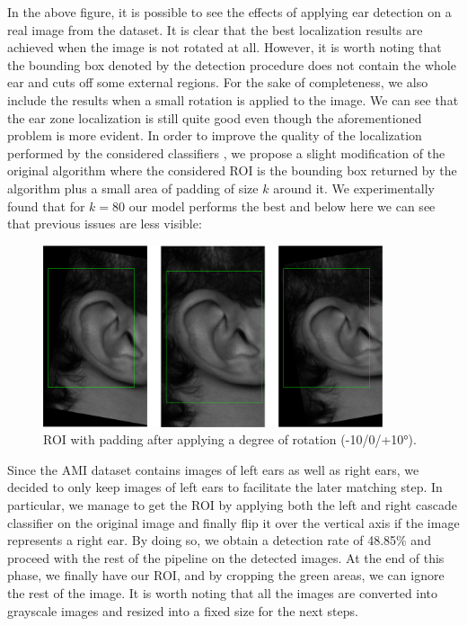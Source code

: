 \documentclass{article}
\begin{document}
In the above figure, it is possible to see the effects of applying ear detection on a real image from the
dataset. It is clear that the best localization results are achieved when the image is not rotated at all.
However, it is worth noting that the bounding box denoted by the detection procedure does not contain the
whole ear and cuts off some external regions.  For the sake of completeness, we also include the results when
a small rotation is applied to the image. We can see that the ear zone localization is still quite good even
though the aforementioned problem is more evident.
In order to improve the quality of the localization performed by the considered classifiers \cite{Castrillon11-caepia},
we propose a slight modification of the original algorithm
where the considered ROI is the bounding box returned by the algorithm plus a small area of padding of size
$k$ around it. We experimentally found that for $k=80$ our model performs the best and below here we can
see that previous issues are less visible:

\begin{figure}[h]
    \label{fig:padding_detection}
    \begin{center}
        \includegraphics[width=10cm,keepaspectratio]{images/padding_detection.png}
        \caption{ROI with padding after applying a degree of rotation (-10/0/+10°).}
    \end{center}
\end{figure}

Since the AMI dataset contains images of left ears as well as right ears, we decided to only keep images
of left ears to facilitate the later matching step. In particular, we manage to get the ROI by applying
both the left and right cascade classifier on the original image and finally flip it over the vertical
axis if the image represents a right ear. By doing so, we obtain a detection rate of 48.85\% and proceed
with the rest of the pipeline on the detected images.
At the end of this phase, we finally have our ROI, and by cropping the green areas,
we can ignore the rest of the image. It is worth noting that all the images are converted into
grayscale images and resized into a fixed size for the next steps.
\end{document}
